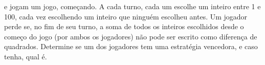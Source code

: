   e  jogam um jogo,  começando. A cada turno, cada um escolhe um inteiro entre 1 e 100, cada vez escolhendo um inteiro que ninguém escolheu antes. Um jogador perde se, no fim de seu turno, a soma de todos os inteiros escolhidos desde o começo do jogo (por ambos os jogadores) não pode ser escrito como diferença de quadrados. Determine se um dos jogadores tem uma estratégia vencedora, e caso tenha, qual é.
